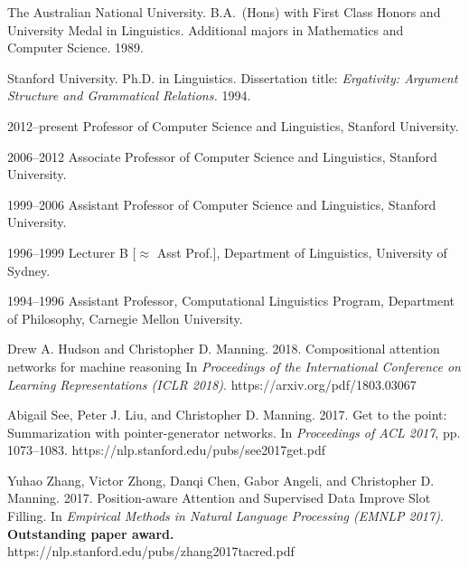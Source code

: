 \documentclass[11pt,letterpaper]{article}
\def\url#1{{\small\sf #1}}
\begin{document}
\begin{vita}
\begin{Professional Preparation}
\item The Australian National University. B.A.\ (Hons) with First Class Honors and University
Medal in Linguistics. Additional majors in Mathematics and Computer
Science. 1989.

\item Stanford University. Ph.D. in Linguistics.
Dissertation title: {\em Ergativity: Argument Structure and Grammatical
Relations.} 1994.

\end{Professional Preparation}

\begin{Appointments}[1996--present]
\item[2012--present] Professor of Computer Science and Linguistics,
  Stanford University.
\item[2006--2012] Associate Professor of Computer Science and
Linguistics, Stanford University.
\item[1999--2006] Assistant Professor of Computer Science and
Linguistics, Stanford University.
\item[1996--1999] Lecturer B [$\approx$ Asst Prof.], %
Department of Linguistics, University of Sydney. 
\item[1994--1996] Assistant Professor,
Computational Linguistics
Program, Department of Philosophy, Carnegie Mellon University.
\end{Appointments}

\begin{Products (most closely related)}

\item Drew A. Hudson and Christopher D. Manning. 2018. 
Compositional attention networks for machine reasoning
In {\em Proceedings of the International Conference on Learning
  Representations (ICLR 2018)}.
\url{https://arxiv.org/pdf/1803.03067}

\item Abigail See, Peter J. Liu, and Christopher D. Manning. 2017. Get
  to the point: Summarization with pointer-generator networks. In
  \emph{Proceedings of ACL 2017}, pp. 1073--1083.
\url{https://nlp.stanford.edu/pubs/see2017get.pdf}

\item Yuhao Zhang, Victor Zhong, Danqi Chen, Gabor Angeli, and Christopher D. Manning. 2017.
Position-aware Attention and Supervised Data Improve Slot Filling.
In \emph{Empirical Methods in Natural Language Processing (EMNLP 2017)}. 
\textbf{Outstanding paper award.}
 \url{https://nlp.stanford.edu/pubs/zhang2017tacred.pdf}


\end{Products (most closely related)}
\end{vita}
\end{document}
